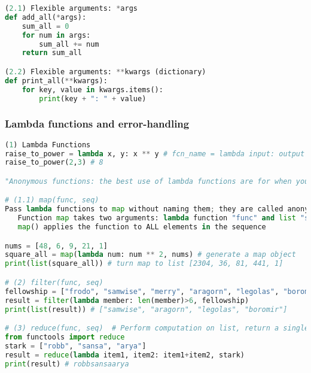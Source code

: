 \documentclass[12pt]{article}
\begin{document}
\begin{lstlisting}[language=Python]
(2.1) Flexible arguments: *args
def add_all(*args):
    sum_all = 0
    for num in args:
        sum_all += num
    return sum_all

(2.2) Flexible arguments: **kwargs (dictionary)
def print_all(**kwargs):
    for key, value in kwargs.items():
        print(key + ": " + value)
\end{lstlisting}

\subsubsection{\normalsize Lambda functions and error-handling}
\begin{lstlisting}[language=Python]
(1) Lambda Functions
raise_to_power = lambda x, y: x ** y # fcn_name = lambda input: output
raise_to_power(2,3) # 8

"Anonymous functions: the best use of lambda functions are for when you want simple functionalities to be anonymously embedded within larger expressions. (The function is not stored in the environment, unlike a function defined with def.)"

# (1.1) map(func, seq)
Pass lambda functions to map without naming them; they are called anonymous fucntions
   Function map takes two arguments: lambda function "func" and list "seq"
   map() applies the function to ALL elements in the sequence

nums = [48, 6, 9, 21, 1]
square_all = map(lambda num: num ** 2, nums) # generate a map object
print(list(square_all)) # turn map to list [2304, 36, 81, 441, 1] 

# (2) filter(func, seq)
fellowship = ["frodo", "samwise", "merry", "aragorn", "legolas", "boromir"]
result = filter(lambda member: len(member)>6, fellowship)
print(list(result)) # ["samwise", "aragorn", "legolas", "boromir"]

# (3) reduce(func, seq)  # Perform computation on list, return a single value 
from functools import reduce
stark = ["robb", "sansa", "arya"]
result = reduce(lambda item1, item2: item1+item2, stark)
print(result) # robbsansaarya
\end{lstlisting}
\end{document}
